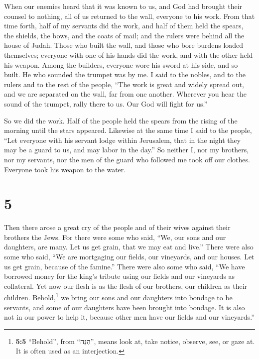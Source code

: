  When our enemies heard that it was known to us, and God
had brought their counsel to nothing, all of us returned to the wall,
everyone to his work.  From that time forth, half of my
servants did the work, and half of them held the spears, the shields,
the bows, and the coats of mail; and the rulers were behind all the
house of Judah.  Those who built the wall, and those who
bore burdens loaded themselves; everyone with one of his hands did the
work, and with the other held his weapon.  Among the
builders, everyone wore his sword at his side, and so built. He who
sounded the trumpet was by me.  I said to the nobles, and
to the rulers and to the rest of the people, ``The work is great and
widely spread out, and we are separated on the wall, far from one
another.  Wherever you hear the sound of the trumpet,
rally there to us. Our God will fight for us.''

 So we did the work. Half of the people held the spears
from the rising of the morning until the stars appeared. 
Likewise at the same time I said to the people, ``Let everyone with his
servant lodge within Jerusalem, that in the night they may be a guard to
us, and may labor in the day.''  So neither I, nor my
brothers, nor my servants, nor the men of the guard who followed me took
off our clothes. Everyone took his weapon to the water.

\hypertarget{section-4}{%
\section{5}\label{section-4}}

 Then there arose a great cry of the people and of their
wives against their brothers the Jews.  For there were
some who said, ``We, our sons and our daughters, are many. Let us get
grain, that we may eat and live.''  There were also some
who said, ``We are mortgaging our fields, our vineyards, and our houses.
Let us get grain, because of the famine.''  There were
also some who said, ``We have borrowed money for the king's tribute
using our fields and our vineyards as collateral.  Yet now
our flesh is as the flesh of our brothers, our children as their
children. Behold,\footnote{\textbf{5:5} ``Behold'', from ``הִנֵּה'',
  means look at, take notice, observe, see, or gaze at. It is often used
  as an interjection.} we bring our sons and our daughters into bondage
to be servants, and some of our daughters have been brought into
bondage. It is also not in our power to help it, because other men have
our fields and our vineyards.''

